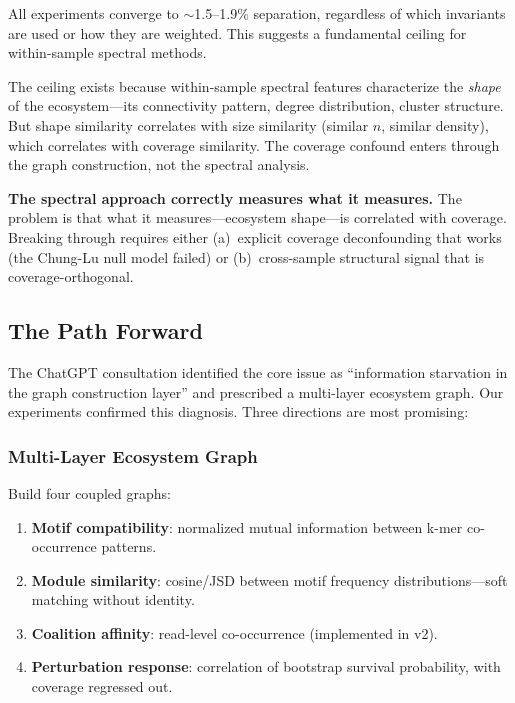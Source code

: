 \documentclass{../yalumba}
\begin{document}
All experiments converge to $\sim$1.5--1.9\% separation, regardless of which
invariants are used or how they are weighted.  This suggests a fundamental
ceiling for within-sample spectral methods.

The ceiling exists because within-sample spectral features characterize the
\emph{shape} of the ecosystem---its connectivity pattern, degree distribution,
cluster structure.  But shape similarity correlates with size similarity
(similar $n$, similar density), which correlates with coverage similarity.
The coverage confound enters through the graph construction, not the spectral
analysis.

\begin{limitation}
\textbf{The spectral approach correctly measures what it measures.}  The
problem is that what it measures---ecosystem shape---is correlated with
coverage.  Breaking through requires either (a)~explicit coverage
deconfounding that works (the Chung-Lu null model failed) or (b)~cross-sample
structural signal that is coverage-orthogonal.
\end{limitation}

\subsection{The Path Forward}

The ChatGPT consultation identified the core issue as ``information starvation
in the graph construction layer'' and prescribed a multi-layer ecosystem graph.
Our experiments confirmed this diagnosis.  Three directions are most promising:

\subsubsection{Multi-Layer Ecosystem Graph}

Build four coupled graphs:
\begin{enumerate}
  \item \textbf{Motif compatibility}: normalized mutual information between
    k-mer co-occurrence patterns.
  \item \textbf{Module similarity}: cosine/JSD between motif frequency
    distributions---soft matching without identity.
  \item \textbf{Coalition affinity}: read-level co-occurrence (implemented
    in v2).
  \item \textbf{Perturbation response}: correlation of bootstrap survival
    probability, with coverage regressed out.
\end{enumerate}
\end{document}
